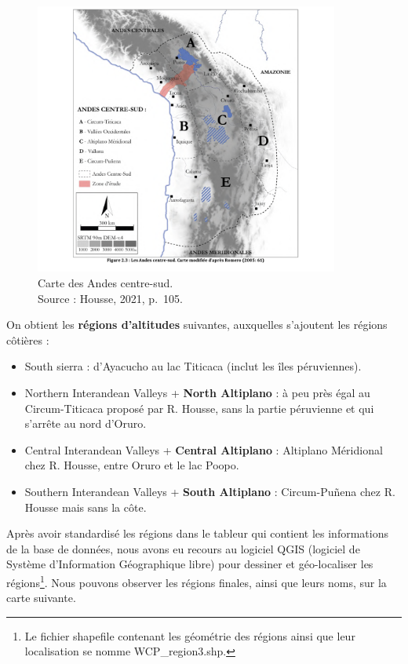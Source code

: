   \begin{figure}[!h]
	\begin{center}
		\includegraphics[width=10cm]{../images/mapHOUSSE_2021_p105.png}
           	 \caption{Carte des Andes centre-sud. \\ Source : Housse, 2021, p.~105.}
           	 \label{fig:carteHousse}
	 \end{center}
  \end{figure}

\noindent On obtient les \textbf{régions d'altitudes} suivantes, auxquelles s'ajoutent les régions côtières : 
\begin{itemize}
	\item South sierra : d'Ayacucho au lac Titicaca (inclut les îles péruviennes).
	\item Northern Interandean Valleys + \textbf{North Altiplano} : à peu près égal au Circum-Titicaca proposé par R. Housse, sans la partie péruvienne et qui s'arrête au nord d'Oruro.
	\item Central Interandean Valleys + \textbf{Central Altiplano} : Altiplano Méridional chez R. Housse, entre Oruro et le lac Poopo.
	\item Southern Interandean Valleys + \textbf{South Altiplano} : Circum-Puñena chez R. Housse mais sans la côte.
\end{itemize}

Après avoir standardisé les régions dans le tableur qui contient les informations de la base de données, nous avons eu recours au logiciel QGIS (logiciel de Système d'Information Géographique libre) pour dessiner et géo-localiser les régions\footnote{Le fichier shapefile contenant les géométrie des régions ainsi que leur localisation se nomme WCP\_region3.shp.}. Nous pouvons observer les régions finales, ainsi que leurs noms, sur la carte suivante.


